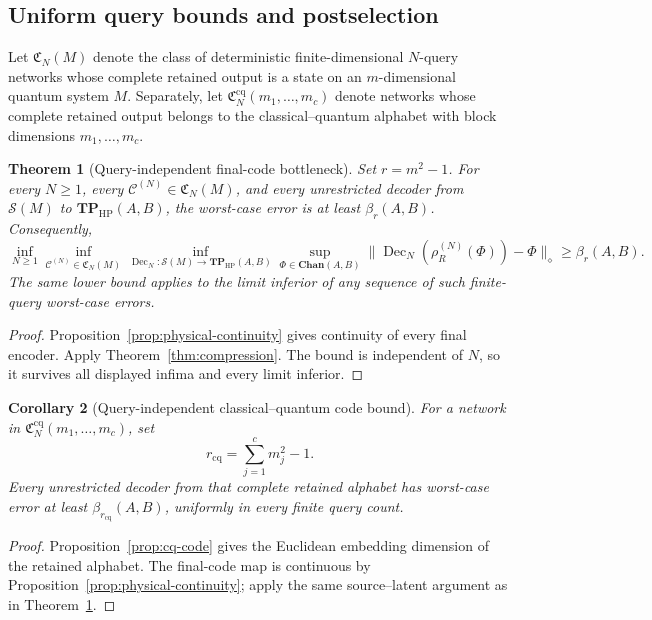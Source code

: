 \documentclass[11pt,a4paper]{article}
\theoremstyle{definition}
\theoremstyle{plain}
\newtheorem{theorem}{Theorem}[section]
\newtheorem{corollary}[theorem]{Corollary}
\theoremstyle{remark}
\newcommand{\Chan}{\mathbf{Chan}}
\newcommand{\Sstate}{\mathcal{S}}
\newcommand{\TPHP}{\mathbf{TP}_{\mathrm{HP}}}
\begin{document}
\subsection{Uniform query bounds and postselection}

Let $\mathfrak C_N(M)$ denote the class of deterministic finite-dimensional
$N$-query networks whose complete retained output is a state on an
$m$-dimensional quantum system $M$. Separately, let
$\mathfrak C_N^{\mathrm{cq}}(m_1,\ldots,m_c)$ denote networks whose complete
retained output belongs to the classical--quantum alphabet with block
dimensions $m_1,\ldots,m_c$.

\begin{theorem}[Query-independent final-code bottleneck]
\label{thm:query-independent}
Set $r=m^2-1$. For every $N\geq1$, every
$\mathcal C^{(N)}\in\mathfrak C_N(M)$, and every unrestricted decoder from
$\Sstate(M)$ to $\TPHP(A,B)$, the worst-case error is at least
$\beta_r(A,B)$. Consequently,
\[
\inf_{N\geq1}
\inf_{\mathcal C^{(N)}\in\mathfrak C_N(M)}
\inf_{\operatorname{Dec}_N:\Sstate(M)\to\TPHP(A,B)}
\sup_{\Phi\in\Chan(A,B)}
\|\operatorname{Dec}_N(\rho_R^{(N)}(\Phi))-\Phi\|_\diamond
\geq\beta_r(A,B).
\]
The same lower bound applies to the limit inferior of any sequence of such
finite-query worst-case errors.
\end{theorem}

\begin{proof}
Proposition~\ref{prop:physical-continuity} gives continuity of every final
encoder. Apply Theorem~\ref{thm:compression}. The bound is independent of
$N$, so it survives all displayed infima and every limit inferior.
\end{proof}

\begin{corollary}[Query-independent classical--quantum code bound]
\label{cor:query-cq}
For a network in
$\mathfrak C_N^{\mathrm{cq}}(m_1,\allowbreak\ldots,\allowbreak m_c)$, set
\[
r_{\mathrm{cq}}=\sum_{j=1}^cm_j^2-1.
\]
Every unrestricted decoder from that complete retained alphabet has
worst-case error at least $\beta_{r_{\mathrm{cq}}}(A,B)$, uniformly in every
finite query count.
\end{corollary}

\begin{proof}
Proposition~\ref{prop:cq-code} gives the Euclidean embedding dimension of
the retained alphabet. The final-code map is continuous by
Proposition~\ref{prop:physical-continuity}; apply the same source--latent
argument as in Theorem~\ref{thm:query-independent}.
\end{proof}
\end{document}
